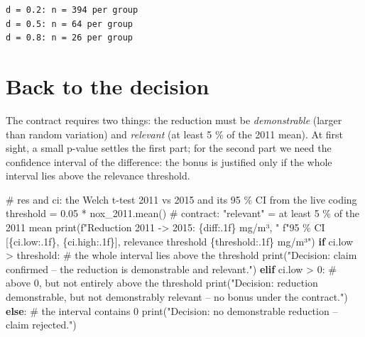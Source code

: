 \documentclass[
  letterpaper,
  DIV=11,
  numbers=noendperiod]{scrreprt}
\newenvironment{Shaded}{\begin{snugshade}}{\end{snugshade}}
\newcommand{\BuiltInTok}[1]{\textcolor[rgb]{0.00,0.23,0.31}{#1}}
\newcommand{\CommentTok}[1]{\textcolor[rgb]{0.37,0.37,0.37}{#1}}
\newcommand{\ControlFlowTok}[1]{\textcolor[rgb]{0.00,0.23,0.31}{\textbf{#1}}}
\newcommand{\DecValTok}[1]{\textcolor[rgb]{0.68,0.00,0.00}{#1}}
\newcommand{\FloatTok}[1]{\textcolor[rgb]{0.68,0.00,0.00}{#1}}
\newcommand{\NormalTok}[1]{\textcolor[rgb]{0.00,0.23,0.31}{#1}}
\newcommand{\OperatorTok}[1]{\textcolor[rgb]{0.37,0.37,0.37}{#1}}
\newcommand{\SpecialCharTok}[1]{\textcolor[rgb]{0.37,0.37,0.37}{#1}}
\newcommand{\SpecialStringTok}[1]{\textcolor[rgb]{0.13,0.47,0.30}{#1}}
\newcommand{\StringTok}[1]{\textcolor[rgb]{0.13,0.47,0.30}{#1}}
\begin{document}
\begin{verbatim}
d = 0.2: n = 394 per group
d = 0.5: n = 64 per group
d = 0.8: n = 26 per group
\end{verbatim}

\section{Back to the decision}\label{back-to-the-decision-3}

The contract requires two things: the reduction must be
\emph{demonstrable} (larger than random variation) and \emph{relevant}
(at least 5 \% of the 2011 mean). At first sight, a small p-value
settles the first part; for the second part we need the confidence
interval of the difference: the bonus is justified only if the whole
interval lies above the relevance threshold.

\begin{Shaded}
\begin{Highlighting}[]
\CommentTok{\# res and ci: the Welch t{-}test 2011 vs 2015 and its 95 \% CI from the live coding}
\NormalTok{threshold }\OperatorTok{=} \FloatTok{0.05} \OperatorTok{*}\NormalTok{ nox\_2011.mean()                 }\CommentTok{\# contract: "relevant" = at least 5 \% of the 2011 mean}
\BuiltInTok{print}\NormalTok{(}\SpecialStringTok{f"Reduction 2011 {-}\textgreater{} 2015: }\SpecialCharTok{\{}\NormalTok{diff}\SpecialCharTok{:.1f\}}\SpecialStringTok{ mg/m³, "}
      \SpecialStringTok{f"95 \% CI [}\SpecialCharTok{\{}\NormalTok{ci}\SpecialCharTok{.}\NormalTok{low}\SpecialCharTok{:.1f\}}\SpecialStringTok{, }\SpecialCharTok{\{}\NormalTok{ci}\SpecialCharTok{.}\NormalTok{high}\SpecialCharTok{:.1f\}}\SpecialStringTok{], relevance threshold }\SpecialCharTok{\{}\NormalTok{threshold}\SpecialCharTok{:.1f\}}\SpecialStringTok{ mg/m³"}\NormalTok{)}
\ControlFlowTok{if}\NormalTok{ ci.low }\OperatorTok{\textgreater{}}\NormalTok{ threshold:                             }\CommentTok{\# the whole interval lies above the threshold}
    \BuiltInTok{print}\NormalTok{(}\StringTok{"Decision: claim confirmed – the reduction is demonstrable and relevant."}\NormalTok{)}
\ControlFlowTok{elif}\NormalTok{ ci.low }\OperatorTok{\textgreater{}} \DecValTok{0}\NormalTok{:                                   }\CommentTok{\# above 0, but not entirely above the threshold}
    \BuiltInTok{print}\NormalTok{(}\StringTok{"Decision: reduction demonstrable, but not demonstrably relevant – no bonus under the contract."}\NormalTok{)}
\ControlFlowTok{else}\NormalTok{:                                              }\CommentTok{\# the interval contains 0}
    \BuiltInTok{print}\NormalTok{(}\StringTok{"Decision: no demonstrable reduction – claim rejected."}\NormalTok{)}
\end{Highlighting}
\end{Shaded}
\end{document}
